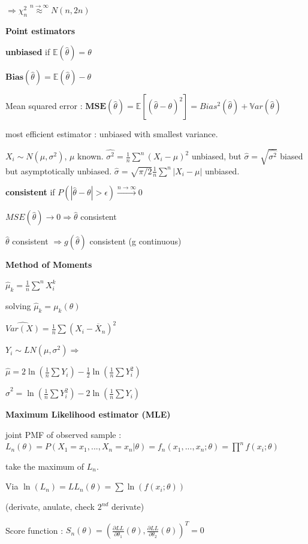 \documentclass[a4paper,10.5pt]{article}
\begin{document}
\begin{multicols}{4}
		$\Rightarrow \chi_n^2 \overset{n\to\infty}\approx N(n,2n)$
		
		\textbf{Point estimators}
		
		\textbf{unbiased} if $\mathbb{E}(\hat{\theta})=\theta$
		
		$\textbf{Bias}(\hat{\theta}) = \mathbb{E}(\hat{\theta})-\theta$
		
		Mean squared error : $\textbf{MSE}(\hat{\theta}) = \mathbb{E}\left[(\hat{\theta}-\theta)^2\right] = Bias^2(\hat{\theta}) + \mathbb{V}ar(\hat{\theta})$
		
		most efficient estimator : unbiased with smallest variance.
		
		$X_i \sim N(\mu,\sigma^2)$, $\mu$ known. $\widehat{\sigma^2} = \frac{1}{n}\sum^n(X_i-\mu)^2$ unbiased, but $\hat{\sigma} = \sqrt{\widehat{\sigma^2}}$ biased but asymptotically unbiased. $\hat{\sigma} = \sqrt{\pi/2}\frac{1}{n}\sum^n|X_i-\mu|$ unbiased.
		
		\textbf{consistent} if $P(|\hat{\theta}-\theta| > \epsilon) \overset{n\to\infty}\to 0$
		
		$MSE(\hat{\theta})\to 0 \Rightarrow \hat{\theta}$ consistent
		
		$\hat{\theta}$ consistent $\Rightarrow g(\hat{\theta})$ consistent (g continuous)
		
		\textbf{Method of Moments}
		
		$\hat{\mu}_k = \frac{1}{n}\sum^n X_i^k$
		
		solving $\hat{\mu}_k = \mu_k(\theta)$
		
		$\widehat{Var(X)} = \frac{1}{n}\sum(X_i-\overline{X}_n)^2$
		
		$Y_i \sim LN(\mu,\sigma^2) \Rightarrow$
		
		$\hat{\mu} = 2\ln\left(\frac{1}{n}\sum Y_i\right) - \frac{1}{2}\ln\left(\frac{1}{n}\sum Y_i^2\right)$
		
		$\hat{\sigma}^2 =  \ln\left(\frac{1}{n}\sum Y_i^2\right) - 2\ln\left(\frac{1}{n}\sum Y_i\right)$
		
		\textbf{Maximum Likelihood estimator (MLE)}
		
		joint PMF of observed sample : $L_n(\theta) = P(X_1=x_1,...,X_n=x_n|\theta) = f_n(x_1,...,x_n ; \theta) = \prod^n f(x_i ; \theta)$
		
		take the maximum of $L_n$.
		
		Via $\ln(L_n) = LL_n(\theta) = \sum \ln(f(x_i;\theta))$
		
		(derivate, anulate, check $2^{nd}$ derivate)
		
		Score function : $S_n(\theta) = (\frac{\partial LL}{\partial\theta_1}(\theta), \frac{\partial LL}{\partial\theta_2}(\theta))^T = 0$
		

\end{multicols}
\end{document}
